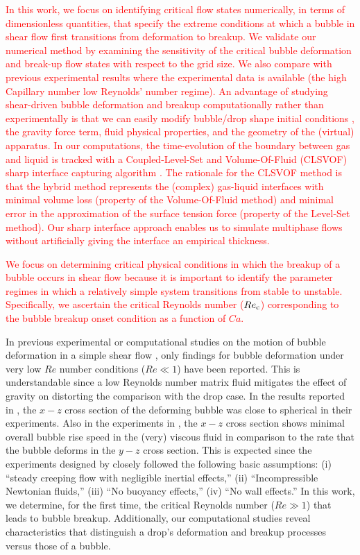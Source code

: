 \documentclass{elsarticle}
\begin{document}
\par
\textcolor{red} {
	In this work, we focus on identifying critical flow states numerically, in terms of dimensionless quantities, that specify the extreme conditions at which a bubble in shear flow first transitions from deformation to breakup.  We validate our numerical method by examining the sensitivity of the critical bubble deformation and break-up flow states with respect to the grid size.  We also compare with previous experimental results where the experimental data is available (the high Capillary number low Reynolds' number regime).  An advantage of studying shear-driven bubble deformation and breakup computationally rather than experimentally is that we can easily modify bubble/drop shape initial conditions \cite{ohta2005computational}, the gravity force term, fluid physical properties, and the geometry of the (virtual) apparatus.  In our computations, the time-evolution of the boundary between gas and liquid is tracked with a Coupled-Level-Set and Volume-Of-Fluid (CLSVOF) sharp interface capturing algorithm \cite{SusPuc00,SusSmiHusOhtZhi07}.  The rationale for the CLSVOF method is that the hybrid method represents the (complex) gas-liquid interfaces with minimal volume loss (property of the Volume-Of-Fluid method) and minimal error in the approximation of the surface tension force (property of the Level-Set method).  Our sharp interface approach\cite{SusSmiHusOhtZhi07,Sus03,KanFedLiu00} enables us to simulate multiphase flows without artificially giving the interface an empirical thickness.
}
\par
\textcolor{red} {
We focus on determining critical physical conditions in which the breakup of a bubble occurs in shear flow because it is important to identify the parameter regimes in which a relatively simple system transitions from stable to unstable.  Specifically, we ascertain the critical Reynolds number ($Re_{\rm c}$) corresponding to the bubble breakup onset condition as a function of $Ca$.  
}
\par
In previous experimental or computational studies on the motion of bubble deformation in a simple shear flow \cite{CanedoETAL,RusMan02, MulTobDreFisWin08}, only findings for bubble deformation under very low $Re$ number conditions ($Re \ll 1$) have been reported.  This is understandable since a low Reynolds number matrix fluid mitigates the effect of gravity on distorting the comparison with the drop case.  In the results reported in \cite{CanedoETAL}, the $x-z$ cross section of the deforming bubble was close to spherical in their experiments.  Also in the experiments in \cite{CanedoETAL}, the $x-z$ cross section shows minimal overall bubble rise speed in the (very) viscous fluid in comparison to the rate that the bubble deforms in the $y-z$ cross section.  This is expected since the experiments designed by \cite{CanedoETAL} closely followed the following basic assumptions: (i) ``steady creeping flow with negligible inertial effects,'' (ii) ``Incompressible Newtonian fluids,'' (iii) ``No buoyancy effects,'' (iv) ``No wall effects.''  In this work, we determine, for the first time, the critical Reynolds number ($Re \gg 1$) that leads to bubble breakup.  Additionally, our computational studies reveal characteristics that distinguish a drop's deformation and breakup processes versus those of a bubble.
\end{document}
